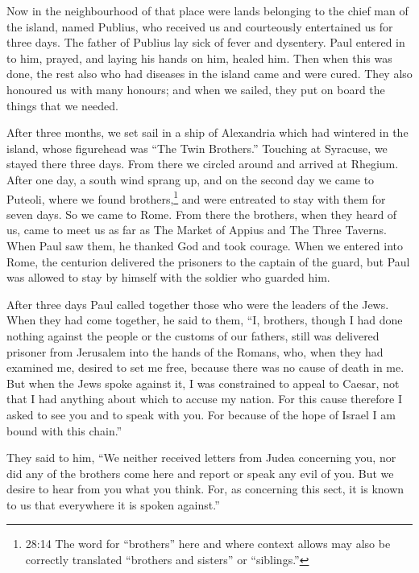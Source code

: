  Now in the neighbourhood of that place were lands belonging
to the chief man of the island, named Publius, who received us and
courteously entertained us for three days.  The father of
Publius lay sick of fever and dysentery. Paul entered in to him, prayed,
and laying his hands on him, healed him.  Then when this was
done, the rest also who had diseases in the island came and were cured.
 They also honoured us with many honours; and when we
sailed, they put on board the things that we needed.

 After three months, we set sail in a ship of Alexandria
which had wintered in the island, whose figurehead was ``The Twin
Brothers.''  Touching at Syracuse, we stayed there three
days.  From there we circled around and arrived at Rhegium.
After one day, a south wind sprang up, and on the second day we came to
Puteoli,  where we found brothers,\footnote{28:14 The word
  for ``brothers'' here and where context allows may also be correctly
  translated ``brothers and sisters'' or ``siblings.''} and were
entreated to stay with them for seven days. So we came to Rome.
 From there the brothers, when they heard of us, came to
meet us as far as The Market of Appius and The Three Taverns. When Paul
saw them, he thanked God and took courage.  When we entered
into Rome, the centurion delivered the prisoners to the captain of the
guard, but Paul was allowed to stay by himself with the soldier who
guarded him.

 After three days Paul called together those who were the
leaders of the Jews. When they had come together, he said to them, ``I,
brothers, though I had done nothing against the people or the customs of
our fathers, still was delivered prisoner from Jerusalem into the hands
of the Romans,  who, when they had examined me, desired to
set me free, because there was no cause of death in me. 
But when the Jews spoke against it, I was constrained to appeal to
Caesar, not that I had anything about which to accuse my nation.
 For this cause therefore I asked to see you and to speak
with you. For because of the hope of Israel I am bound with this
chain.''

 They said to him, ``We neither received letters from Judea
concerning you, nor did any of the brothers come here and report or
speak any evil of you.  But we desire to hear from you what
you think. For, as concerning this sect, it is known to us that
everywhere it is spoken against.''

